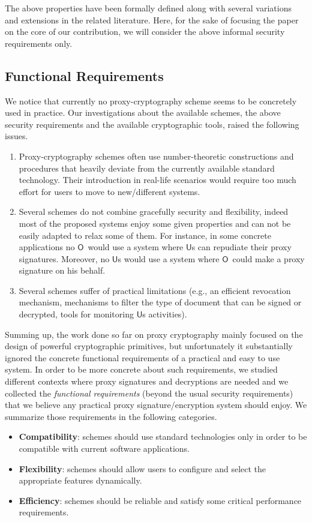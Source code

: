 \documentclass[preprint,authoryear,12pt]{elsarticle}
\newcommand{\Owner}{\ensuremath{\mathsf{O}}}
\newcommand{\User}{\ensuremath{\mathsf{U}}}
\begin{document}
The above properties have been formally defined along with several variations and extensions in the related literature. Here, for the sake of
focusing the paper on the core of our contribution, we will consider the above informal security requirements only.
\subsection{Functional Requirements}

We notice that currently no proxy-cryptography scheme seems to be concretely used in practice. Our investigations about the available schemes,
the above security requirements and the available cryptographic tools, raised the following issues.
\begin{enumerate}
\item Proxy-cryptography schemes often use number-theoretic constructions and procedures that heavily deviate from the currently available standard technology.
Their introduction in real-life scenarios would require too much effort for users to move to new/different systems.
\item Several schemes do not combine gracefully security and flexibility, indeed most of the proposed systems enjoy some given properties and can not be easily
adapted to relax some of them. For instance, in some concrete applications no \Owner\ would use a system where \User s can repudiate their proxy
signatures. Moreover, no \User s would use a system where \Owner\ could make a proxy signature on his behalf.
\item Several schemes suffer of practical limitations (e.g., an efficient revocation mechanism, mechanisms to filter the type of document that can be signed or decrypted,
tools for monitoring \User s activities).
\end{enumerate}

Summing up, the work done so far on proxy cryptography mainly focused on the design of powerful cryptographic primitives, but unfortunately it substantially ignored the concrete functional requirements of a practical and easy to use system. In order to be more concrete about such requirements, we studied different contexts
where proxy signatures and decryptions are needed and we collected the \emph{functional requirements} (beyond the usual security requirements) that we believe any practical proxy signature/encryption system should enjoy. We summarize those requirements in the following categories.
\begin{itemize}
\item {\bf Compatibility}: schemes should use standard technologies only in order to be compatible with current software applications. 
\item {\bf Flexibility}: schemes should allow users to configure and select the appropriate features dynamically.
\item {\bf Efficiency}: schemes should be reliable and satisfy some critical performance requirements.
\end{itemize}
\end{document}
